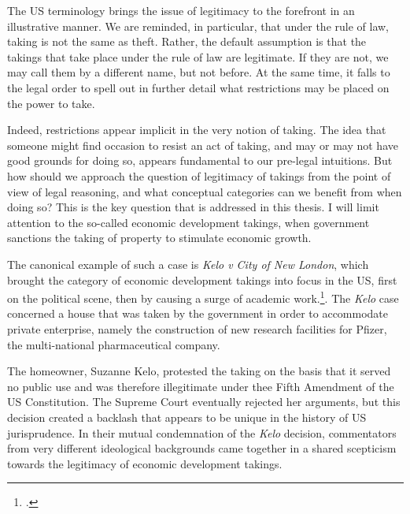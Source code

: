 The US terminology brings the issue of legitimacy to the forefront in an illustrative manner. We are reminded, in particular, that under the rule of law, taking is not the same as theft. Rather, the default assumption is that the takings that take place under the rule of law are legitimate. If they are not, we may call them by a different name, but not before. At the same time, it falls to the legal order to spell out in further detail what restrictions may be placed on the power to take. 

Indeed, restrictions appear implicit in the very notion of taking. The idea that someone might find occasion to resist an act of taking, and may or may not have good grounds for doing so, appears fundamental to our pre-legal intuitions. But how should we approach the question of legitimacy of takings from the point of view of legal reasoning, and what conceptual categories can we benefit from when doing so? This is the key question that is addressed in this thesis. I will limit attention to the so-called economic development takings, when government sanctions the taking of property to stimulate economic growth.


The canonical example of such a case is {\it Kelo v City of New London}, which brought the category of economic development takings into focus in the US, first on the political scene, then by causing a surge of academic work.\footcite{kelo05}. The {\it Kelo} case concerned a house that was taken by the government in order to accommodate private enterprise, namely the construction of new research facilities for Pfizer, the multi-national pharmaceutical company.

The homeowner, Suzanne Kelo, protested the taking on the basis that it served no public use and was therefore illegitimate under thee Fifth Amendment of the US Constitution. The Supreme Court eventually rejected her arguments, but this decision created a backlash that appears to be unique in the history of US jurisprudence. In their mutual condemnation of the {\it Kelo} decision, commentators from very different ideological backgrounds came together in a shared scepticism towards the legitimacy of economic development takings.

